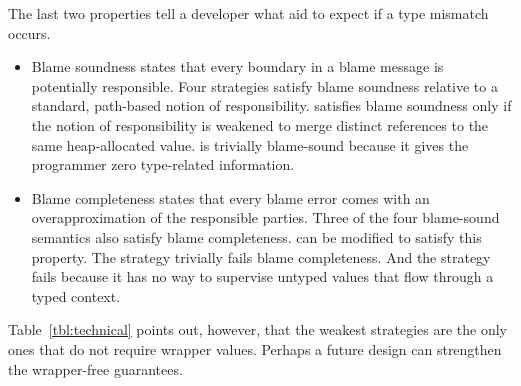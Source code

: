 \documentclass[ twoside,open=right,titlepage,numbers=noenddot,headinclude,%
                footinclude=true,cleardoublepage=empty,abstract=off,
                BCOR=5mm,paper=a4,fontsize=11pt,%
                ngerman,american,%
                parts,pdfspacing]{scrreprt}
\newlength{\stabLeft}
\newcommand{\atItemizeStart}[0]{\addtolength{\stabLeft}{\labelsep}
                                \addtolength{\stabLeft}{\labelwidth}}
\begin{document}
\noindent{}The last two properties tell a developer what aid to expect if a
 type mismatch occurs.

\begin{itemize}\atItemizeStart

\item Blame soundness states that every boundary in a blame message is potentially
 responsible.
Four strategies satisfy blame soundness relative to a standard, path{-}based notion of
 responsibility.
\relax{\tname} satisfies blame soundness only if the notion of responsibility is weakened to
 merge distinct references to the same heap{-}allocated value.
\relax{\ename} is trivially blame{-}sound because it gives the programmer zero type{-}related information.

\item Blame completeness states that every blame error comes with an
 overapproximation of the responsible parties.
Three of the four blame{-}sound semantics also satisfy blame completeness.
\relax{\fname} can be modified to satisfy this property.
The \relax{\ename} strategy trivially fails blame completeness.
And the \relax{\tname} strategy fails because it has no way to supervise untyped
values that flow through a typed context.\end{itemize}

\noindent{}Table~\ref{tbl:technical} points out, however, that the weakest strategies
 are the only ones that do not require wrapper values.
Perhaps a future design can strengthen the wrapper{-}free guarantees.
\end{document}
